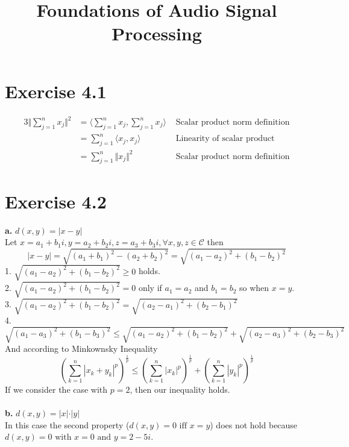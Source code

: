 \documentclass[12pt]{article}
\title{Foundations of Audio Signal Processing\\ \ass}
\author{\auth}
\begin{document}
	\maketitle
	\section*{Exercise 4.1}
	\begin{alignat*}{3}
	\Vert \sum_{j=1}^{n} x_j\Vert^2 &= \langle\sum_{j=1}^{n} x_j, \sum_{j=1}^{n} x_j\rangle & \text{ Scalar product norm definition}\\
	&=\sum_{j=1}^{n} \langle x_j, x_j\rangle & \text{ Linearity of scalar product}\\
	&=\sum_{j=1}^{n} \Vert x_j \Vert^2 & \text{ Scalar product norm definition}
	\end{alignat*}
	\section*{Exercise 4.2}
	\textbf{a.} $d(x,y) = \vert x - y \vert$\\
	Let $x = a_1 + b_1 i, y = a_2 + b_2 i, z = a_3 + b_3 i, \forall x, y, z \in \mathcal{C} $ then
	\begin{equation*}
		\vert x - y \vert = \sqrt{(a_1 + b_1)^2 - (a_2 + b_2)^2} = \sqrt{(a_1 - a_
			2)^2 + (b_1 - b_2)^2}
	\end{equation*}
	1. $\sqrt{(a_1 - a_2)^2 + (b_1 - b_2)^2} \geq 0$ holds.\\
	2. $\sqrt{(a_1 - a_2)^2 + (b_1 - b_2)^2} = 0$ only if $a_1 = a_2$ and $b_1 = b_2$ so when $x=y$.\\
	3. $\sqrt{(a_1 - a_2)^2 + (b_1 - b_2)^2} = \sqrt{(a_2 - a_1)^2 + (b_2 - b_1)^2}$\\
	4. $\sqrt{(a_1 - a_3)^2 + (b_1 - b_3)^2} \leq \sqrt{(a_1 - a_2)^2 + (b_1 - b_2)^2} + \sqrt{(a_2 - a_3)^2 + (b_2 - b_3)^2}$
	And according to Minkownsky Inequality
	\begin{equation*}
	\left(\sum _{{k=1}}^{n}|x_{k}+y_{k}|^{p}\right)^{{{\frac  {1}{p}}}}\leq \left(\sum _{{k=1}}^{n}|x_{k}|^{p}\right)^{{{\frac  {1}{p}}}}+\left(\sum _{{k=1}}^{n}|y_{k}|^{p}\right)^{{{\frac  {1}{p}}}}
	\end{equation*}
	If we consider the case with $p=2$, then our inequality holds.\\\\
	\textbf{b.} $d(x,y) = \vert x \vert \cdot \vert y \vert$\\
	In this case the second property ($d(x, y) = 0 \text{ iff } x = y$) does not hold because $d(x,y) = 0 \text{ with } x = 0 \text{ and } y = 2 - 5i$.\\\\
\end{document}
